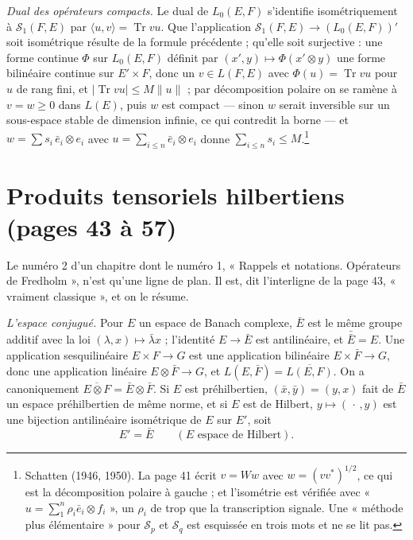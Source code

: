 \documentclass[11pt,a4paper]{article}
\begin{document}
\emph{Dual des opérateurs compacts.} Le dual de $L_0(E,F)$ s'identifie
isométriquement à $\mathcal{S}_1(F,E)$ par $\langle u, v\rangle =
\operatorname{Tr} vu$. Que l'application $\mathcal{S}_1(F,E) \to
(L_0(E,F))'$ soit isométrique résulte de la formule précédente ; qu'elle
soit surjective : une forme continue $\Phi$ sur $L_0(E,F)$ définit par
$(x', y) \mapsto \Phi(x' \otimes y)$ une forme bilinéaire continue sur
$E' \times F$, donc un $v \in L(F,E)$ avec $\Phi(u) = \operatorname{Tr} vu$
pour $u$ de rang fini, et $|\operatorname{Tr} vu| \leq M\|u\|$ ; par
décomposition polaire on se ramène à $v = w \geq 0$ dans $L(E)$, puis $w$
est compact --- sinon $w$ serait inversible sur un sous-espace stable de
dimension infinie, ce qui contredit la borne --- et $w = \sum s_i\,
\bar{e}_i \otimes e_i$ avec $u = \sum_{i \leq n} \bar{e}_i \otimes e_i$ donne
$\sum_{i \leq n} s_i \leq M$.\footnote{Schatten (1946, 1950). La page 41
écrit $v = Ww$ avec $w = (vv^{*})^{1/2}$, ce qui est la décomposition polaire
à gauche ; et l'isométrie est vérifiée avec « $u = \sum_1^n \rho_i \bar{e}_i
\otimes f_i$ », un $\rho_i$ de trop que la transcription signale. Une
« méthode plus élémentaire » pour $\mathcal{S}_p$ et $\mathcal{S}_q$ est
esquissée en trois mots et ne se lit pas.}

\section*{Produits tensoriels hilbertiens (pages 43 à 57)}

Le numéro 2 d'un chapitre dont le numéro 1, « Rappels et notations.
Opérateurs de Fredholm », n'est qu'une ligne de plan. Il est, dit
l'interligne de la page 43, « vraiment classique », et on le résume.

\emph{L'espace conjugué.} Pour $E$ un espace de Banach complexe, $\bar{E}$
est le même groupe additif avec la loi $(\lambda, x) \mapsto \bar\lambda x$ ;
l'identité $E \to \bar{E}$ est antilinéaire, et $\bar{\bar{E}} = E$. Une
application sesquilinéaire $E \times F \to G$ est une application bilinéaire
$E \times \bar{F} \to G$, donc une application linéaire $E \otimes \bar{F}
\to G$, et $L(E, \bar{F}) = \overline{L(E,F)}$. On a canoniquement
$\overline{E \otimes F} = \bar{E} \otimes \bar{F}$. Si $E$ est préhilbertien,
$(\bar{x}, \bar{y}) = (y, x)$ fait de $\bar{E}$ un espace préhilbertien de
même norme, et si $E$ est de Hilbert, $y \mapsto (\,\cdot\,, y)$ est une
bijection antilinéaire isométrique de $E$ sur $E'$, soit
\[
  E' = \bar{E} \qquad (E \text{ espace de Hilbert}).
\]
\end{document}
